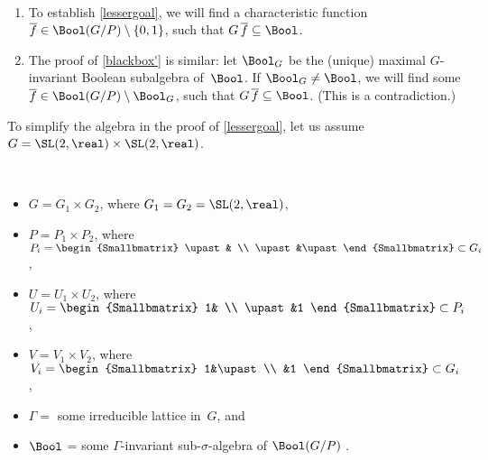 \begin{rem} \ 
\noprelistbreak
\begin{enumerate}
\item To establish \cref{lessergoal}, we will find a characteristic function $\overline f \in \Bool(G/P) \setminus \{0,1\}$, such that $G \, \overline f \subseteq \Bool$.
\item The proof of \cref{blackbox'} is similar: let $\Bool_G$ be the (unique) maximal $G$-invariant Boolean subalgebra of~$\Bool$. If $\Bool_G \neq \Bool$, we will find some $\overline f \in \Bool(G/P) \setminus \Bool_G$, such that $G \, \overline f \subseteq \Bool$. (This is a contradiction.)
\end{enumerate}
\end{rem}

\begin{assump} 
To  simplify the algebra in the proof of \cref{lessergoal}, let us assume $G = \SL(2,\real) \times \SL(2,\real)$.
\end{assump}

\begin{notation} \label{BlackBoxPfNotn} \ 
\noprelistbreak
\begin{itemize}
\item $G = G_1 \times G_2$, where $G_1 = G_2 = \SL(2,\real)$,
\item $P = P_1 \times P_2$, where $P_i = \begin{Smallbmatrix} \upast& \\ \upast&\upast \end{Smallbmatrix}
\subset G_i$,
\item $U = U_1 \times U_2$, where $U_i = \begin{Smallbmatrix} 1& \\ \upast&1 \end{Smallbmatrix}
\subset P_i$,
\item $V = V_1 \times V_2$, where $V_i = \begin{Smallbmatrix} 1&\upast \\ &1 \end{Smallbmatrix}
\subset G_i$,
\item $\Gamma = $ some irreducible lattice in~$G$,
and
\item $\Bool$ = some $\Gamma$-invariant sub-$\sigma$-algebra of $\Bool(G/P)$ .
\end{itemize}
\end{notation}

